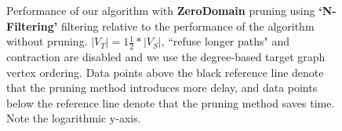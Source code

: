 \begin{figure}
\begin{subfigure} {0.5\linewidth}

\end{subfigure}

\caption{Performance of our algorithm with \textbf{ZeroDomain} pruning using \textbf{`N-Filtering'} filtering relative to the performance of the algorithm without pruning. $|V_T|=1\frac{1}{2}*|V_S|$, ``refuse longer paths" and contraction are disabled and we use the degree-based target graph vertex ordering. Data points above the black reference line denote that the pruning method introduces more delay, and data points below the reference line denote that the pruning method saves time. Note the logarithmic y-axis.}	
\label{fig:zerodomainnfiltering}
\end{figure}
